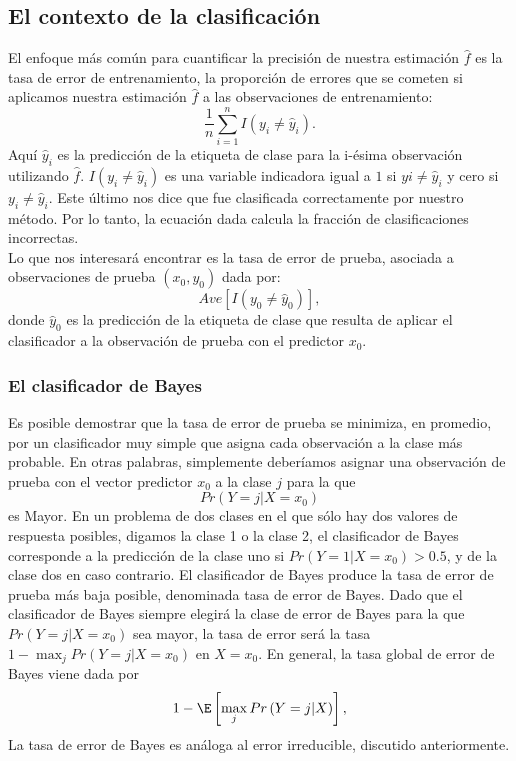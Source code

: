  \subsection{El contexto de la clasificación}
 El enfoque más común para cuantificar la precisión de nuestra estimación $\hat{f}$ es la tasa de error de entrenamiento, la proporción de errores que se cometen si aplicamos nuestra estimación $\hat{f}$ a las observaciones de entrenamiento:
 $$\dfrac{1}{n}\sum_{i=1}^n I\left(y_i\neq \hat{y}_i\right).$$
 Aquí $\hat{y}_i$ es la predicción de la etiqueta de clase para la i-ésima observación utilizando $\hat{f}$. $I\left(y_i\neq \hat{y}_i\right)$ es una variable indicadora igual a $1$ si $yi\neq \hat{y}_i$ y cero si $y_i\neq \hat{y}_i$. Este último nos dice que fue clasificada correctamente por nuestro método. Por lo tanto, la ecuación dada calcula la fracción de clasificaciones incorrectas.\\
 Lo que nos interesará encontrar es la tasa de error de prueba, asociada a observaciones de prueba $(x_0,y_0)$ dada por: 
 $$Ave\left[I\left(y_0\neq \hat{y}_0\right)\right],$$
 donde $\hat{y}_0$ es la predicción de la etiqueta de clase que resulta de aplicar el clasificador a la observación de prueba con el predictor $x_0$.

 \subsubsection{El clasificador de Bayes}
 Es posible demostrar que la tasa de error de prueba se minimiza, en promedio, por un clasificador muy simple que asigna cada observación a la clase más probable. En otras palabras, simplemente deberíamos asignar una observación de prueba con el vector predictor $x_0$ a la clase $j$ para la que
 $$Pr\left(Y=j|X=x_0\right)$$
 es Mayor. En un problema de dos clases en el que sólo hay dos valores de respuesta posibles, digamos la clase 1 o la clase 2, el clasificador de Bayes corresponde a la predicción de la clase uno si $Pr(Y = 1|X = x_0 ) > 0.5$, y de la clase dos en caso contrario. El clasificador de Bayes produce la tasa de error de prueba más baja posible, denominada tasa de error de Bayes. Dado que el clasificador de Bayes siempre elegirá la clase de error de Bayes para la que $Pr\left(Y=j|X=x_0\right)$ sea mayor, la tasa de error será la tasa $1-\max_j Pr\left(Y=j|X=x_0\right)$ en $X=x_0$. En general, la tasa global de error de Bayes viene dada por
 $$1-\E\left[\max_j Pr\left(Y=j|X\right)\right],$$
 La tasa de error de Bayes es análoga al error irreducible, discutido anteriormente.


